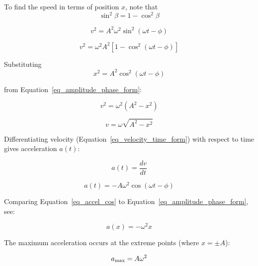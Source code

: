 \documentclass{article}
\begin{document}
To find the speed in terms of position $x$, note that 
\begin{equation}
\sin^2 \beta = 1 - \cos^2 \beta 
\label{sin_squared}
\end{equation}

\begin{equation}
v^2 = A^2 \omega^2 \sin^2(\omega t - \phi)
\label{eq_v_squared}
\end{equation}

\begin{equation}
v^2 = \omega^2 A^2 [1 - \cos^2(\omega t - \phi)]
\label{eq_v_squared_trig}
\end{equation}

Substituting 
\begin{equation}
    x^2 = A^2 \cos^2(\omega t - \phi)
    \label{x_squared}
\end{equation}

from Equation~\ref{eq_amplitude_phase_form}:

\begin{equation}
v^2 = \omega^2 (A^2 - x^2)
\label{eq_v_squared_final}
\end{equation}

\begin{equation}
v = \omega \sqrt{A^2 - x^2}
\label{eq_speed_pos_form}
\end{equation}

Differentiating velocity (Equation~\ref{eq_velocity_time_form}) with respect to time gives acceleration $a(t)$:

\begin{equation}
a(t) = \frac{dv}{dt}
\label{eq_a_derivative_op}
\end{equation}

\begin{equation}
a(t) = -A \omega^2 \cos(\omega t - \phi)
\label{eq_accel_cos}
\end{equation}

Comparing Equation~\ref{eq_accel_cos} to Equation~\ref{eq_amplitude_phase_form}, see:

\begin{equation}
a(x) = -\omega^2 x
\label{eq_acceleration_pos_form}
\end{equation}

The maximum acceleration occurs at the extreme points (where $x = \pm A$):

\begin{equation}
a_{\rm max} = A \omega^2
\label{eq_a_max}
\end{equation}
\end{document}
